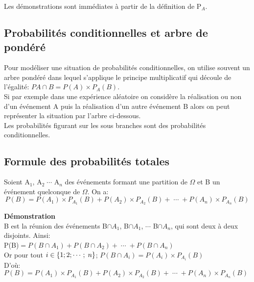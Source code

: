 Les démonstrations sont immédiates à partir de la définition de  P$ _{A} $.
\subsection{Probabilités conditionnelles et arbre de pondéré}


 Pour   modéliser  une situation de probabilités conditionnelles,  on utilise  souvent un arbre  pondéré  dans lequel s'applique  le principe multiplicatif  qui découle de l'égalité:\; $P A\cap B=P(A) \times P_{A}(B)$.\\ Si par exemple dans une expérience aléatoire  on considère la réalisation ou non d'un événement A   puis  la réalisation d'un autre événement B alors on peut représenter la situation par l'arbre ci-dessous.\\ Les probabilités figurant sur les sous branches sont des probabilités conditionnelles. 
 

  \subsection{Formule des probabilités totales}
\begin{theorem}
Soient  A$ _{1} $,  A$ _{2} \;  \cdots   $ \; A$ _{n} $  des événements formant une partition de $ \Omega $  et B un événement quelconque de $ \Omega $.  On a: 
$$ P(B)= P(A_{1}) \times P_{A_{1}}(B)+P(A_{2}) \times P_{A_{2}}(B)+\;\cdots\;  +P(A_{n}) \times P_{A_{n}}(B)$$

\end{theorem}

\textbf{Démonstration}\\
B est la réunion des événements B$ \cap A_{1} $,  B$ \cap A_{1} $, \;$ \cdots $\; B$ \cap A_{n} $,  qui sont  deux à deux disjoints.  Ainsi:\\
P(B)$ = P(B\cap A_{1})+P(B\cap A_{2}) +\;\cdots\;  +P(B\cap A_{n})$\\
 Or pour tout $ i\in\left\{1; 2; \cdots ;\; n\right\} $;\;\;  $P(B\cap A_{i})= P(A_{i}) \times P_{A_{i}}(B) $\\
  D'où:  \;\; $P(B) = P(A_{1}) \times P_{A_{1}}(B)+P(A_{2}) \times P_{A_{2}}(B)+\;\cdots\;  +P(A_{n}) \times P_{A_{n}}(B)$\\
  
